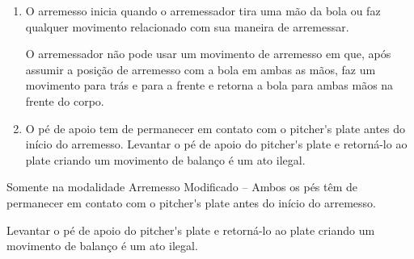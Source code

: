 \begin{enumerate}[label=(\alph*)]
	\item O arremesso inicia quando o arremessador tira uma mão da bola ou faz qualquer movimento relacionado com sua maneira de arremessar.

	O arremessador não pode usar um movimento de arremesso em que, após assumir  a posição de arremesso com a bola em ambas as mãos, faz um movimento para trás e para a frente e retorna a bola para ambas mãos na frente do corpo.

	\item O pé de apoio tem de permanecer em contato com o \gls{pitcher's plate} antes do início do arremesso. Levantar o pé de apoio do \gls{pitcher's plate} e retorná-lo ao \gls{plate} criando um movimento de balanço é um ato ilegal.
\end{enumerate}

Somente na modalidade Arremesso Modificado -- Ambos os pés têm de  permanecer em contato com o \gls{pitcher's plate} antes do início do arremesso.

Levantar o pé de apoio do \gls{pitcher's plate} e retorná-lo ao \gls{plate} criando um movimento de balanço é um ato ilegal.

